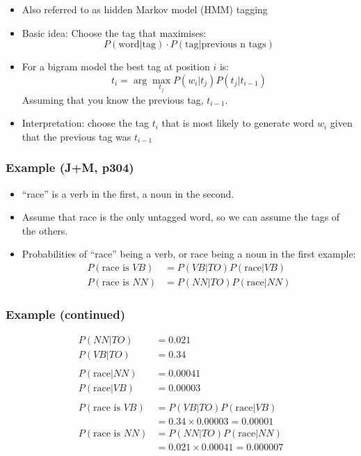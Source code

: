 \begin{frame}
  \begin{itemize}
  \item<1-> Also referred to as hidden Markov model (HMM) tagging
  \item<1-> Basic idea:  Choose the tag  that maximises:
    \[ P(\mbox{word} | \mbox{tag}) \cdot 
       P(\mbox{tag} | \mbox{previous n tags}) \]
       
  \item<2-> For a bigram model the best tag at position $i$ is:
    \[ t_i = \arg\max_{t_j} P(w_i|t_j) P(t_j | t_{i-1}) \]
    Assuming that you know the previous tag, $t_{i-1}$.
  \item<3-> Interpretation: choose the tag $t_i$ that is most likely to
    \alert{generate} word $w_i$ given that the previous tag was
    $t_{i-1}$ 
  \end{itemize}
\end{frame}

\begin{frame}
  \frametitle{Example (J+M, p304)}
  {\small
   

  \medskip
   }

  \begin{itemize}
  \item<2-> ``race'' is a verb in the first, a noun in the second.
  \item<3-> Assume that race is the only untagged word, so we can assume
    the tags of the others.
  \item<4-> Probabilities of ``race'' being a verb, or race being a noun
    in the first example:
    \begin{align*}
      P(\mbox{race is }VB) &= P(VB|TO) P(\mbox{race}|VB) \\
      P(\mbox{race is }NN) &= P(NN|TO) P(\mbox{race}|NN) 
    \end{align*}
  \end{itemize}
\end{frame}

\begin{frame}
  \frametitle{Example (continued)}
  \begin{align*}
    P(NN|TO) &= 0.021 \\
    P(VB|TO) &= 0.34 \\
    \\
    P(\mbox{race}|NN) &= 0.00041\\
    P(\mbox{race}|VB) &= 0.00003\\
    \\
    P(\mbox{race is }VB) &= P(VB|TO) P(\mbox{race}|VB) \\
    &= 0.34 \times 0.00003 = 0.00001 \\
    P(\mbox{race is }NN) &= P(NN|TO) P(\mbox{race}|NN) \\
    &= 0.021 \times 0.00041 = 0.000007
   \end{align*}
\end{frame}

